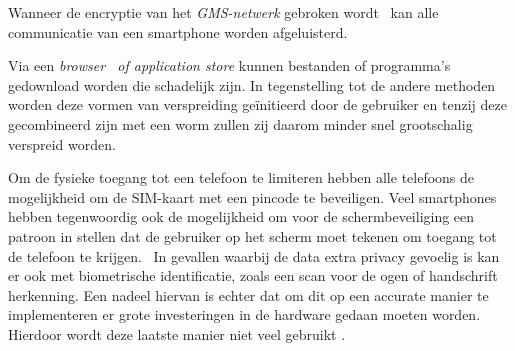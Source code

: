 Wanneer de encryptie van het \emph{GMS-netwerk} gebroken wordt  kan alle communicatie van een smartphone worden afgeluisterd.  

Via een \emph{browser  of application store} kunnen bestanden of programma’s gedownload worden die schadelijk zijn. In tegenstelling tot de andere methoden worden deze vormen van verspreiding geïnitieerd door de gebruiker en tenzij deze gecombineerd zijn met een worm zullen zij daarom minder snel grootschalig verspreid worden. 	

Om de fysieke toegang tot een telefoon te limiteren hebben alle telefoons de mogelijkheid om de SIM-kaart met een pincode te beveiligen. Veel smartphones hebben tegenwoordig ook de mogelijkheid om voor de schermbeveiliging een patroon in stellen dat de gebruiker op het scherm moet tekenen om toegang tot de telefoon te krijgen.  In gevallen waarbij de data extra privacy gevoelig is kan er ook met biometrische identificatie, zoals een scan voor de ogen of handschrift herkenning. Een nadeel hiervan is echter dat om dit op een accurate manier te implementeren er grote investeringen in de hardware gedaan moeten worden. Hierdoor wordt deze laatste manier niet veel gebruikt \citep{thirumathyam2010}.  


